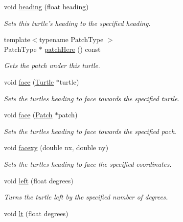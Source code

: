 \begin{DoxyCompactItemize}
void \hyperlink{classrepast_1_1relogo_1_1_turtle_aa0f8626257269ab4f06e336510d8832e}{heading} (float heading)
\begin{DoxyCompactList}\small\item\em Sets this turtle's heading to the specified heading. \end{DoxyCompactList}\item 
{\footnotesize template$<$typename Patch\-Type $>$ }\\Patch\-Type $\ast$ \hyperlink{classrepast_1_1relogo_1_1_turtle_afa0fa798e62fcd2e1451d6a2993144cb}{patch\-Here} () const 
\begin{DoxyCompactList}\small\item\em Gets the patch under this turtle. \end{DoxyCompactList}\item 
void \hyperlink{classrepast_1_1relogo_1_1_turtle_a93ef82fc40f5afe5de01d6059b4fff56}{face} (\hyperlink{classrepast_1_1relogo_1_1_turtle}{Turtle} $\ast$turtle)
\begin{DoxyCompactList}\small\item\em Sets the turtles heading to face towards the specified turtle. \end{DoxyCompactList}\item 
void \hyperlink{classrepast_1_1relogo_1_1_turtle_ab83335d773663b81f3b6bf0603b9b14c}{face} (\hyperlink{classrepast_1_1relogo_1_1_patch}{Patch} $\ast$patch)
\begin{DoxyCompactList}\small\item\em Sets the turtles heading to face towards the specified pach. \end{DoxyCompactList}\item 
void \hyperlink{classrepast_1_1relogo_1_1_turtle_a2ba533eb615ebbb4e654580e8d4e62fc}{facexy} (double nx, double ny)
\begin{DoxyCompactList}\small\item\em Sets the turtles heading to face the specified coordinates. \end{DoxyCompactList}\item 
void \hyperlink{classrepast_1_1relogo_1_1_turtle_a8c227fd729f0acf6a0b7605b2113df2a}{left} (float degrees)
\begin{DoxyCompactList}\small\item\em Turns the turtle left by the specified number of degrees. \end{DoxyCompactList}\item 
void \hyperlink{classrepast_1_1relogo_1_1_turtle_a56d1e5b136986d15590005b686d3033b}{lt} (float degrees)

\end{DoxyCompactItemize}
